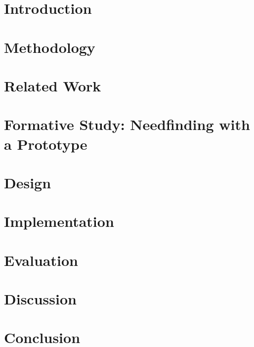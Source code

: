 \documentclass[final,twoside]{vutinfth}
\begin{document}
\chapter{Introduction}


\chapter{Methodology}


\chapter{Related Work}


\chapter{Formative Study: Needfinding with a Prototype}


\chapter{Design}


\chapter{Implementation}


\chapter{Evaluation}


\chapter{Discussion}


\chapter{Conclusion}



\backmatter

\begin{aitools}

\end{aitools}
\end{document}
